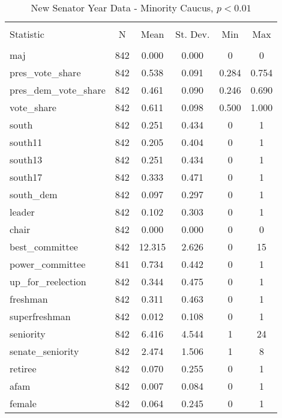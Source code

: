 \documentclass[12pt]{article}
\begin{document}
\begin{table}[!htbp] \centering 
	\caption{New Senator Year Data - Minority Caucus, $ p < 0.01 $} 
	\begin{tabular}{@{\extracolsep{5pt}}lccccc} 
		\\[-1.8ex]\hline 
		\hline \\[-1.8ex] 
		Statistic & \multicolumn{1}{c}{N} & \multicolumn{1}{c}{Mean} & \multicolumn{1}{c}{St. Dev.} & \multicolumn{1}{c}{Min} & \multicolumn{1}{c}{Max} \\ 
		\hline \\[-1.8ex] 
		maj & 842 & 0.000 & 0.000 & 0 & 0 \\ 
		pres\_vote\_share & 842 & 0.538 & 0.091 & 0.284 & 0.754 \\ 
		pres\_dem\_vote\_share & 842 & 0.461 & 0.090 & 0.246 & 0.690 \\ 
		vote\_share & 842 & 0.611 & 0.098 & 0.500 & 1.000 \\ 
		south & 842 & 0.251 & 0.434 & 0 & 1 \\ 
		south11 & 842 & 0.205 & 0.404 & 0 & 1 \\ 
		south13 & 842 & 0.251 & 0.434 & 0 & 1 \\ 
		south17 & 842 & 0.333 & 0.471 & 0 & 1 \\ 
		south\_dem & 842 & 0.097 & 0.297 & 0 & 1 \\ 
		leader & 842 & 0.102 & 0.303 & 0 & 1 \\ 
		chair & 842 & 0.000 & 0.000 & 0 & 0 \\ 
		best\_committee & 842 & 12.315 & 2.626 & 0 & 15 \\ 
		power\_committee & 841 & 0.734 & 0.442 & 0 & 1 \\ 
		up\_for\_reelection & 842 & 0.344 & 0.475 & 0 & 1 \\ 
		freshman & 842 & 0.311 & 0.463 & 0 & 1 \\ 
		superfreshman & 842 & 0.012 & 0.108 & 0 & 1 \\ 
		seniority & 842 & 6.416 & 4.544 & 1 & 24 \\ 
		senate\_seniority & 842 & 2.474 & 1.506 & 1 & 8 \\ 
		retiree & 842 & 0.070 & 0.255 & 0 & 1 \\ 
		afam & 842 & 0.007 & 0.084 & 0 & 1 \\ 
		female & 842 & 0.064 & 0.245 & 0 & 1 \\ 

\end{tabular}
\end{table}
\end{document}
